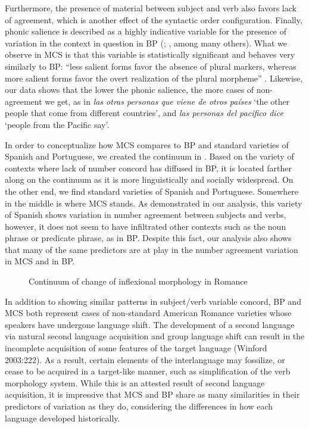 \documentclass[output=paper,colorlinks,citecolor=brown,
]{langscibook}
\begin{document}
Furthermore, the presence of material between subject and verb also favors lack of agreement, which is another effect of the syntactic order configuration. Finally, phonic salience is described as a highly indicative variable for the presence of variation in the context in question in BP (\citealt{brandao2012concordancia}; \citealt{mendes2015variable}, among many others). What we observe in MCS is that this variable is statistically significant and behaves very similarly to BP: 
``less salient forms favor the absence of plural markers, whereas more salient forms favor the overt realization of the plural morpheme'' \citep[362]{mendes2015variable}. Likewise, our data shows that the lower the phonic salience, the more cases of non-agreement we get, as in \textit{las otras personas que viene de otros países} `the other people that come from different countries', and \textit{las personas del pacifico dice} `people from the Pacific say'. 

In order to conceptualize how MCS compares to BP and standard varieties of Spanish and Portuguese, we created the continuum in . Based on the variety of contexts where lack of number concord has diffused in BP, it is located farther along on the continuum as it is more linguistically and socially widespread. On the other end, we find standard varieties of Spanish and Portuguese. Somewhere in the middle is where MCS stands. As demonstrated in our analysis, this variety of Spanish shows variation in number agreement between subjects and verbs, however, it does not seem to have infiltrated other contexts such as the noun phrase or predicate phrase, as in BP. Despite this fact, our analysis also shows that many of the same predictors are at play in the number agreement variation in MCS and in BP.

\begin{figure}


    \caption{Continuum of change of inflexional morphology in Romance}
    \label{fig:critchfield:3}
\end{figure}


In addition to showing similar patterns in subject/verb variable concord, BP and MCS both represent cases of non-standard American Romance varieties whose speakers have undergone language shift. The development of a second language via natural second language acquisition and group language shift can result in the incomplete acquisition of some features of the target language (Winford 2003:222). As a result, certain elements of the interlanguage may fossilize, or cease to be acquired in a target-like manner, such as simplification of the verb morphology system. While this is an attested result of second language acquisition, it is impressive that MCS and BP share as many similarities in their predictors of variation as they do, considering the differences in how each language developed historically. 
\end{document}
